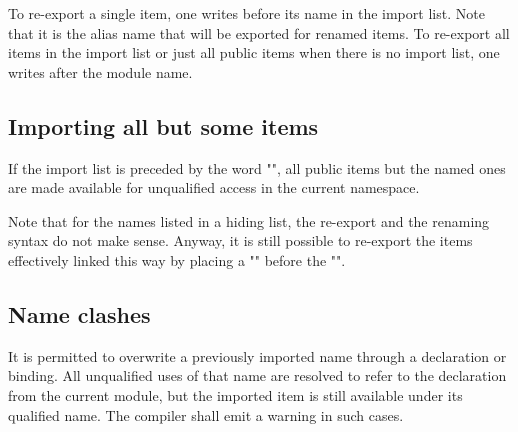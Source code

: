 To re-export a single item, one writes  before its name in the import list. Note that it is the alias name that will be exported for renamed items.
To re-export all items in the import list or just all public items when there is no import list, one writes  after the module name.


\subsection{Importing all but some items}

If the import list is preceded by the word "", all public items but the named ones are made available for unqualified access in the current namespace.


Note that for the names listed in a hiding list, the re-export and the renaming syntax do not make sense. 
Anyway, it is still possible to re-export the items effectively linked this way by placing a "" before the "".


\subsection{Name clashes}

It is permitted to overwrite a previously imported name through a declaration or binding.
All unqualified uses of that name are resolved to refer to the declaration from the current module, 
but the imported item is still available under its qualified name.
The compiler shall emit a warning in such cases.

